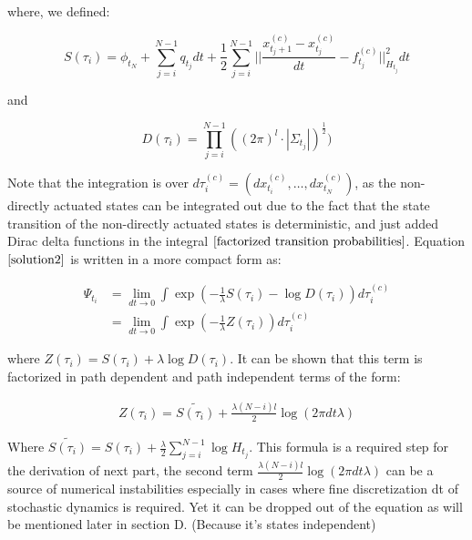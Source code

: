 \documentclass[journal]{IEEEtran}
\begin{document}
where, we defined:

\begin{equation}
  S(\tau_i) = \phi_{t_N}+\sum_{j=i}^{N-1}q_{t_j}dt + \frac{1}{2}\sum_{j=i}^{N-1}|| \frac{x_{t_j+1}^{(c)} - x_{t_j}^{(c)}}{dt} - f_{t_j}^{(c)}||^2_{H_{t_j}} dt \nonumber 
\end{equation}

and

\begin{equation}
  D(\tau_i) = \prod_{j = i}^{N-1} ((2\pi)^{l} \cdot |\Sigma_{t_j}|)^{\frac{1}{2}}) \nonumber
\end{equation}

Note that the integration is over $d\tau_i^{(c)} = (dx_{t_i}^{(c)},\ldots,dx_{t_N}^{(c)})$, as the non-directly actuated states
can be integrated out due to the fact that the state transition of the non-directly actuated states is deterministic, 
and just added Dirac delta functions in the integral $\ref{factorized transition probabilities}$. 
Equation $\ref{solution2}$ is written in a more compact form as:

\begin{equation}
  \begin{aligned}
   \Psi_{t_i} & = \lim_{dt\to 0}\int \exp(-\frac{1}{\lambda}S(\tau_i) -\log D(\tau_i)) d\tau_i^{(c)} \\
 & = \lim_{dt\to 0}\int \exp(-\frac{1}{\lambda}Z(\tau_i)) d\tau_i^{(c)}  
  \label{solution3}
  \end{aligned}
\end{equation}

where $Z(\tau_i) = S(\tau_i)+\lambda \log D(\tau_i)$. It can be shown that this term is factorized in path dependent and path independent terms of the form:

\begin{equation}
  \begin{aligned}
   Z(\tau_i) = \tilde{S(\tau_i)}+ \frac{\lambda (N-i)l}{2} \log (2\pi dt \lambda)
  \end{aligned}
\end{equation}

Where $\tilde{S(\tau_i)} = S(\tau_i) + \frac{\lambda}{2} \sum_{j = i}^{N-1} \log H_{t_j}$. This formula is a required step for the derivation of next part,
the second term $\frac{\lambda (N-i)l}{2} \log (2\pi dt \lambda)$ can be a source of numerical instabilities especially in cases where fine discretization dt of 
stochastic dynamics is required. Yet it can be dropped out of the equation as will be mentioned later in section D. (Because it's states independent)
\end{document}
